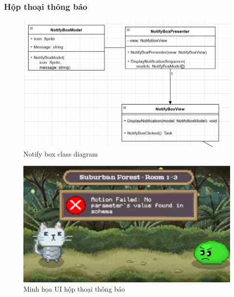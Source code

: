 \subsubsection{Hộp thoại thông báo}
\begin{figure}[H]
	\centering
	\includegraphics[width=13cm]{Images/NotifyBoxView.png}
	\vspace{0.5cm}
	\caption{Notify box class diagram}
\end{figure}

\begin{figure}[H]
	\centering
	\includegraphics[width=13cm]{Images/NotifyBoxUI.png}
	\vspace{0.5cm}
	\caption{Minh họa UI hộp thoại thông báo}
\end{figure}